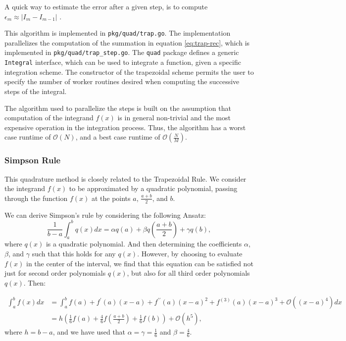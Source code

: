 \documentclass[10pt, a4paper]{article}
\begin{document}
  A quick way to estimate the error after a given step, is to compute $\epsilon_m \approx |I_m - I_{m-1}|$
  \cite{nr}.

  This algorithm is implemented in \texttt{pkg/quad/trap.go}. The implementation parallelizes the computation
  of the summation in equation \ref{eq:trap-rec}, which is implemented in \texttt{pkg/quad/trap\_step.go}.
  The \texttt{quad} package defines a generic \texttt{Integral} interface, which can be used to integrate
  a function, given a specific integration scheme. The constructor of the trapezoidal scheme permits the
  user to specify the number of worker routines desired when computing the successive steps of the integral.

  The algorithm used to parallelize the steps is built on the assumption that computation of the integrand
  $f(x)$ is in general non-trivial and the most expensive operation in the integration process. Thus, the
  algorithm has a worst case runtime of $\mathcal{O}(N)$, and a best case runtime of $\mathcal{O}(\frac{N}{M})$.

  \subsubsection{Simpson Rule}
  This quadrature method is closely related to the Trapezoidal Rule\footnotemark. We consider the integrand
  $f(x)$ to be approximated by a quadratic polynomial, passing through the function $f(x)$ at the points
  $a$, $\frac{a+b}{2}$, and $b$.


  We can derive Simpson's rule by considering the following Ansatz:
  \begin{equation}
  \frac{1}{b-a} \int_a^b q(x) dx = \alpha q(a) + \beta q(\frac{a+b}{2}) + \gamma q(b),
  \end{equation}
  where $q(x)$ is a quadratic polynomial. And then determining the coefficients $\alpha$, $\beta$, and $\gamma$
  such that this holds for any $q(x)$. However, by choosing to evaluate $f(x)$ in the center of the interval,
  we find that this equation can be satisfied not just for second order polynomials $q(x)$, but also
  for all third order polynomials $q(x)$. Then:

  \begin{equation}
  \begin{split}
  \int_a^b f(x) dx &= \int_a^b f(a) + f^\prime(a) (x-a) + f^{\prime\prime}(a) (x-a)^2 + f^{(3)}(a) (x-a)^3 + \mathcal{O}\left((x-a)^4\right) dx \\
  &= h \left( \frac{1}{6} f(a) + \frac{4}{6} f(\frac{a+b}{2}) + \frac{1}{6} f(b) \right) + \mathcal{O}(h^5),
  \end{split}
  \end{equation}
  where $h = b-a$, and we have used that $\alpha = \gamma = \frac{1}{6}$ and $\beta = \frac{4}{6}$.
\end{document}
